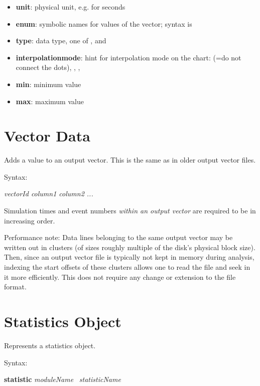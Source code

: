 \begin{itemize}
    \item \textbf{unit}: physical unit, e.g.  for seconds
    \item \textbf{enum}: symbolic names for values of the vector;
          syntax is 
    \item \textbf{type}: data type, one of ,  and 
    \item \textbf{interpolationmode}: hint for interpolation mode on the
          chart:  (=do not connect the dots), ,
          , 
    \item \textbf{min}: minimum value
    \item \textbf{max}: maximum value
\end{itemize}




\section{Vector Data}

Adds a value to an output vector. This is the same as in older output
vector files.

Syntax:

\hspace{20mm} {\itshape vectorId column1 column2 ...}

Simulation times and event numbers \textit{within an output vector} are
required to be in increasing order.

Performance note: Data lines belonging to the same output vector may be
written out in clusters (of sizes roughly multiple of the disk's
physical block size). Then, since an output vector file is typically
not kept in memory during analysis, indexing the start offsets of these
clusters allows one to read the file and seek in it more efficiently.
This does not require any change or extension to the file format.



\section{Statistics Object}

Represents a statistics object.

Syntax:

\hspace{20mm} \textbf{statistic} \textit{moduleName} \ \textit{statisticName}

